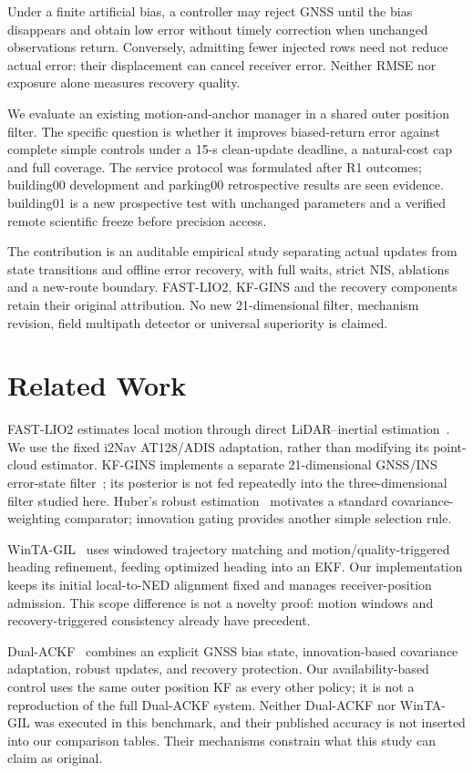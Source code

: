 \documentclass[conference]{IEEEtran}
\begin{document}
Under a finite artificial bias, a controller may reject GNSS until the bias disappears and obtain low error without timely correction when unchanged observations return. Conversely, admitting fewer injected rows need not reduce actual error: their displacement can cancel receiver error. Neither RMSE nor exposure alone measures recovery quality.

We evaluate an existing motion-and-anchor manager in a shared outer position filter. The specific question is whether it improves biased-return error against complete simple controls under a 15-s clean-update deadline, a natural-cost cap and full coverage. The service protocol was formulated after R1 outcomes; building00 development and parking00 retrospective results are seen evidence. building01 is a new prospective test with unchanged parameters and a verified remote scientific freeze before precision access.

The contribution is an auditable empirical study separating actual updates from state transitions and offline error recovery, with full waits, strict NIS, ablations and a new-route boundary. FAST-LIO2, KF-GINS and the recovery components retain their original attribution. No new 21-dimensional filter, mechanism revision, field multipath detector or universal superiority is claimed.
\section{Related Work}
FAST-LIO2 estimates local motion through direct LiDAR--inertial estimation~\cite{fastlio2}. We use the fixed i2Nav AT128/ADIS adaptation, rather than modifying its point-cloud estimator. KF-GINS implements a separate 21-dimensional GNSS/INS error-state filter~\cite{kfgins}; its posterior is not fed repeatedly into the three-dimensional filter studied here. Huber's robust estimation~\cite{huber} motivates a standard covariance-weighting comparator; innovation gating provides another simple selection rule.

WinTA-GIL~\cite{winta} uses windowed trajectory matching and motion/quality-triggered heading refinement, feeding optimized heading into an EKF. Our implementation keeps its initial local-to-NED alignment fixed and manages receiver-position admission. This scope difference is not a novelty proof: motion windows and recovery-triggered consistency already have precedent.

Dual-ACKF~\cite{dual} combines an explicit GNSS bias state, innovation-based covariance adaptation, robust updates, and recovery protection. Our availability-based control uses the same outer position KF as every other policy; it is not a reproduction of the full Dual-ACKF system. Neither Dual-ACKF nor WinTA-GIL was executed in this benchmark, and their published accuracy is not inserted into our comparison tables. Their mechanisms constrain what this study can claim as original.
\end{document}

